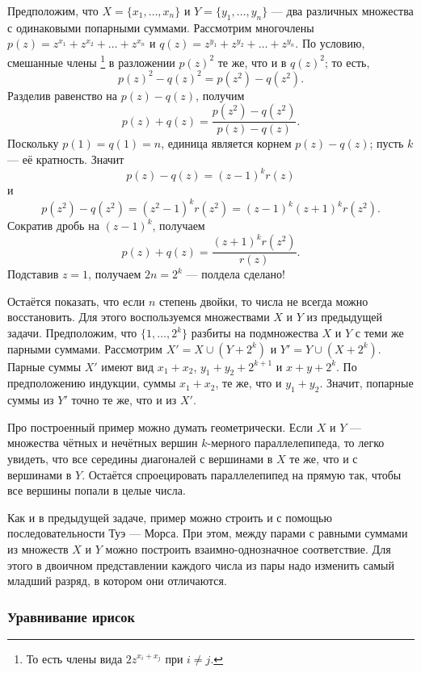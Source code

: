 Предположим, что $X = \{x_1 , \dots , x_n\}$ и $Y = \{y_1 , \dots , y_n\}$ --- два различных множества с одинаковыми попарными суммами.
Рассмотрим многочлены
$p(z)=z^{x_1} + z^{x_2} + \dots + z^{x_n}$
и 
$q(z)=z^{y_1} + z^{y_2} + \dots + z^{y_n}$.
По условию, смешанные члены%
\footnote{То есть члены вида $2z^{x_i+x_j}$ при $i\ne j$.} в разложении $p(z)^2$ те же, что и в $q(z)^2$;
то есть,
\[p(z)^2 -q(z)^2 = p(z^2 )-q(z^2).\]
Разделив равенство на $p(z) - q(z)$, получим
\[p(z) + q(z) =
\frac{p(z^2 ) - q(z^2 )}{p(z) - q(z)}.
\]
Поскольку $p(1) = q(1) = n$,
единица является корнем $p(z) - q(z)$; пусть $k$ --- её кратность.
Значит
\[p(z) - q(z) = (z - 1)^k r(z)\]
и
\[p(z^2 ) - q(z^2 ) = (z^2 - 1)^k r(z^2 )= (z - 1)^k (z + 1)^k r(z^2).\]
Сократив дробь на $(z - 1)^k$, получаем
\[p(z) + q(z) =
\frac{(z + 1)^k r(z^2)}{r(z)}.
\]
Подставив $z = 1$, получаем $2n = 2^k$ --- полдела сделано!

Остаётся показать, что если $n$ степень двойки, то
числа не всегда можно восстановить.
Для этого воспользуемся множествами $X$ и $Y$ из предыдущей задачи.
Предположим, что $\{1, \dots , 2^k\}$ разбиты на подмножества $X$ и $Y$ с теми же парными суммами.
Рассмотрим $X' = X \cup (Y + 2^k)$ и $Y' = Y \cup (X + 2^k)$.
Парные суммы $X'$ имеют вид $x_1 + x_2$, $y_1 + y_2 + 2^{k+1}$ и $x + y + 2^k$.
По предположению индукции,
суммы $x_1 + x_2$, те же, что и $y_1 + y_2$.
Значит, попарные суммы из $Y'$ точно те же, что и из $X'$.

\begin{addedbytheeditors}
Про построенный пример можно думать геометрически.
Если $X$ и $Y$ --- множества чётных и нечётных вершин $k$-мерного параллелепипеда, то легко увидеть, что все середины диагоналей с вершинами в $X$ те же, что и с вершинами в $Y$.
Остаётся спроецировать параллелепипед на прямую так, чтобы все вершины попали в целые числа.

Как и в предыдущей задаче, пример можно строить и с помощью последовательности Туэ --- Морса.
При этом, между парами с равными суммами из множеств $X$ и $Y$ можно построить взаимно-однозначное соответствие.
Для этого в двоичном представлении каждого числа из пары надо изменить самый младший разряд, в котором они отличаются.
\pr
\end{addedbytheeditors}

\subsubsection*{Уравнивание ирисок}

